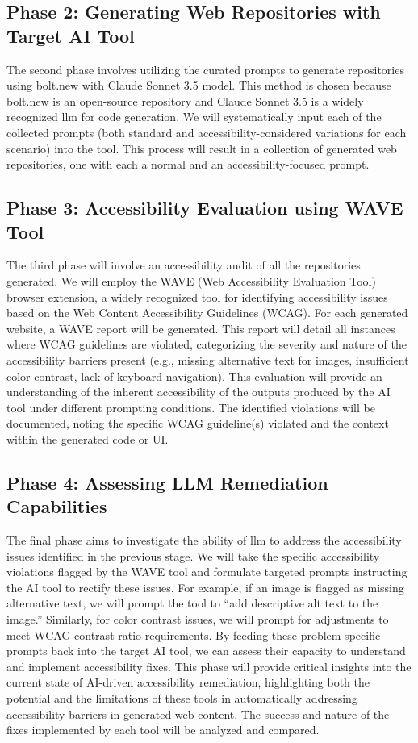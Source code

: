 \documentclass{article}
\begin{document}
\subsection{Phase 2: Generating Web Repositories with Target AI Tool}

The second phase involves utilizing the curated prompts to generate repositories using bolt.new with Claude Sonnet 3.5 model.
This method is chosen because bolt.new is an open-source repository and Claude Sonnet 3.5 is a widely recognized \ac{llm} for code generation.
We will systematically input each of the collected prompts (both standard and accessibility-considered variations for each scenario) into the tool.
This process will result in a collection of generated web repositories, one with each a normal and an accessibility-focused prompt.

\subsection{Phase 3: Accessibility Evaluation using WAVE Tool}

The third phase will involve an accessibility audit of all the repositories generated.
We will employ the WAVE (Web Accessibility Evaluation Tool) browser extension,
a widely recognized tool for identifying accessibility issues based on the Web Content Accessibility Guidelines (WCAG).
For each generated website, a WAVE report will be generated.
This report will detail all instances where WCAG guidelines are violated,
categorizing the severity and nature of the accessibility barriers present
(e.g., missing alternative text for images, insufficient color contrast, lack of keyboard navigation).
This evaluation will provide an understanding of the inherent accessibility of the outputs produced by the AI tool under different prompting conditions.
The identified violations will be documented, noting the specific WCAG guideline(s) violated and the context within the generated code or UI.

\subsection{Phase 4: Assessing LLM Remediation Capabilities}

The final phase aims to investigate the ability of llm to address the accessibility issues identified in the previous stage.
We will take the specific accessibility violations flagged by the WAVE tool and formulate targeted prompts instructing the AI tool to rectify these issues.
For example, if an image is flagged as missing alternative text, we will prompt the tool to ``add descriptive alt text to the image.''
Similarly, for color contrast issues, we will prompt for adjustments to meet WCAG contrast ratio requirements.
By feeding these problem-specific prompts back into the target AI tool, we can assess their capacity to understand and implement accessibility fixes.
This phase will provide critical insights into the current state of AI-driven accessibility remediation,
highlighting both the potential and the limitations of these tools in automatically addressing accessibility barriers in generated web content.
The success and nature of the fixes implemented by each tool will be analyzed and compared.
\end{document}
